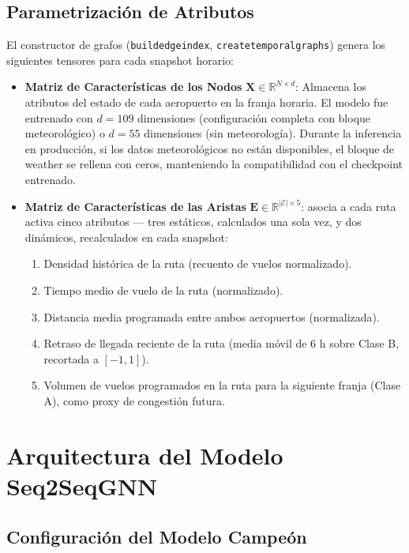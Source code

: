 \documentclass[12pt,oneside,a4paper]{report}
\renewcommand{\_}{\textunderscore\allowbreak}
\begin{document}
\subsection{Parametrización de Atributos}
\label{sub:atributos_dinamicos}

El constructor de grafos (\texttt{build\_edge\_index}, \texttt{create\_temporal\_graphs}) genera los siguientes tensores para cada snapshot horario:

\begin{itemize}
    \item \textbf{Matriz de Características de los Nodos} $\mathbf{X} \in \mathbb{R}^{N \times d}$: Almacena los atributos del estado de cada aeropuerto en la franja horaria. El modelo fue entrenado con $d = 109$ dimensiones (configuración completa con bloque meteorológico) o $d = 55$ dimensiones (sin meteorología). Durante la inferencia en producción, si los datos meteorológicos no están disponibles, el bloque de weather se rellena con ceros, manteniendo la compatibilidad con el checkpoint entrenado.
    \item \textbf{Matriz de Características de las Aristas} $\mathbf{E} \in \mathbb{R}^{|\mathcal{E}| \times 5}$:
asocia a cada ruta activa cinco atributos --- tres estáticos, calculados una sola vez, y dos
dinámicos, recalculados en cada snapshot:
\begin{enumerate}
    \item Densidad histórica de la ruta (recuento de vuelos normalizado).
    \item Tiempo medio de vuelo de la ruta (normalizado).
    \item Distancia media programada entre ambos aeropuertos (normalizada).
    \item Retraso de llegada reciente de la ruta (media móvil de 6 h sobre Clase B, recortada a $[-1,1]$).
    \item Volumen de vuelos programados en la ruta para la siguiente franja (Clase A), como proxy de congestión futura.
\end{enumerate}
\end{itemize}

\section{Arquitectura del Modelo Seq2SeqGNN}
\label{sec:arquitectura_gnn}

\subsection{Configuración del Modelo Campeón}
\label{sub:config_campeon}
\end{document}
